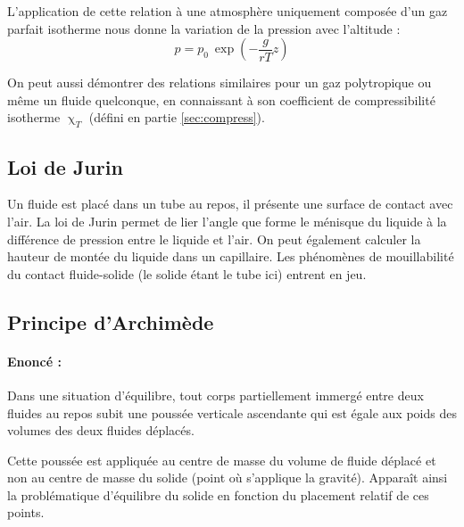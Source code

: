 L'application de cette relation à une atmosphère uniquement composée d'un gaz parfait isotherme nous donne la variation de la pression avec l'altitude :
%
\begin{equation}
    p = p_0~\exp{\left( -\frac{g}{rT}z \right)}
\end{equation}

On peut aussi démontrer des relations similaires pour un gaz polytropique ou même un fluide quelconque, en connaissant à son coefficient de compressibilité isotherme $\upchi_T$ (défini en partie \ref{sec:compress}).

\subsection{Loi de Jurin}
Un fluide est placé dans un tube au repos, il présente une surface de contact avec l'air. La loi de Jurin permet de lier l'angle que forme le ménisque du liquide à la différence de pression entre le liquide et l'air. On peut également calculer la hauteur de montée du liquide dans un capillaire. Les phénomènes de mouillabilité du contact fluide-solide (le solide étant le tube ici) entrent en jeu.

\subsection{Principe d'Archimède}
\paragraph{Enoncé :}Dans une situation d'équilibre, tout corps partiellement immergé entre deux fluides au repos subit une poussée verticale ascendante qui est égale aux poids des volumes des deux fluides déplacés.

Cette poussée est appliquée au centre de masse du volume de fluide déplacé et non au centre de masse du solide (point où s'applique la gravité). Apparaît ainsi la problématique d'équilibre du solide en fonction du placement relatif de ces points.
